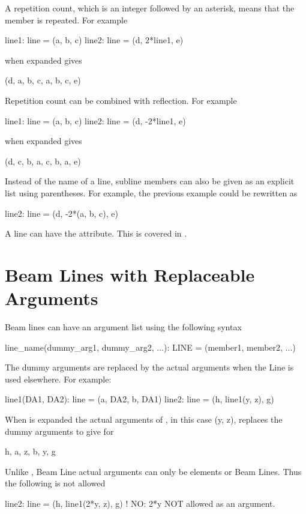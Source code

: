 A repetition count, which is an integer followed by an asterisk, 
means that the member is
repeated. For example
\begin{example}
  line1: line = (a, b, c)
  line2: line = (d, 2*line1, e)
\end{example}
 when expanded gives
\begin{example}
  (d, a, b, c, a, b, c, e)
\end{example}
Repetition count can be combined with reflection. For example
\begin{example}
  line1: line = (a, b, c)
  line2: line = (d, -2*line1, e)
\end{example}
 when expanded gives
\begin{example}
  (d, c, b, a, c, b, a, e)
\end{example}
Instead of the name of a line, subline members can also be given as an explicit 
list using parentheses. For example, the previous example could be rewritten as
\begin{example}
  line2: line = (d, -2*(a, b, c), e)
\end{example}

A line can have the  attribute. This is covered in
.

\section{Beam Lines with Replaceable Arguments}

Beam lines can have an argument list using the following syntax
\begin{example}
  line_name(dummy_arg1, dummy_arg2, ...): LINE = (member1, member2, ...)
\end{example}
The dummy arguments are replaced by the actual arguments when the Line is used
elsewhere. For example:
\begin{example}
  line1(DA1, DA2): line = (a, DA2, b, DA1)
  line2: line = (h, line1(y, z), g)
\end{example}
When  is expanded the actual arguments of , in this
case \vn(y, z), replaces the dummy arguments  to give for
\begin{example}
  h, a, z, b, y, g
\end{example} 
Unlike \mad, Beam Line actual arguments can only be elements or Beam Lines. 
Thus the following is not allowed
\begin{example}
  line2: line = (h, line1(2*y, z), g)   ! NO: 2*y NOT allowed as an argument.
\end{example}

